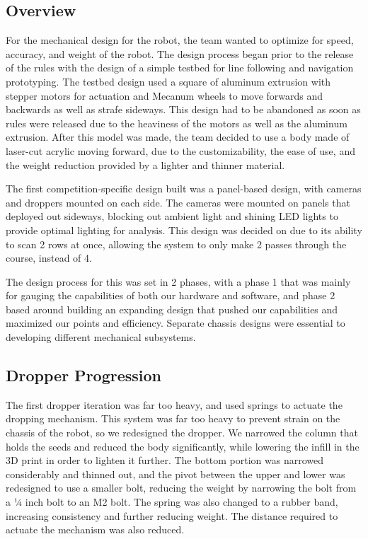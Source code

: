 \documentclass[11pt, twoside]{report}
\begin{document}
\subsection{Overview}
For the mechanical design for the robot, the team wanted to optimize for speed, accuracy, and weight of the robot.  The design process began prior to the release of the rules with the design of a simple testbed for line following and navigation prototyping.  The testbed design used a square of aluminum extrusion with stepper motors for actuation and Mecanum wheels to move forwards and backwards as well as strafe sideways.  This design had to be abandoned as soon as rules were released due to the heaviness of the motors as well as the aluminum extrusion.  After this model was made, the team decided to use a body made of laser-cut acrylic moving forward, due to the customizability, the ease of use, and the weight reduction provided by a lighter and thinner material.

The first competition-specific design built was a panel-based design, with cameras and droppers mounted on each side.  The cameras were mounted on panels that deployed out sideways, blocking out ambient light and shining LED lights to provide optimal lighting for analysis. This design was decided on due to its ability to scan 2 rows at once, allowing the system to only make 2 passes through the course, instead of 4.  

The design process for this was set in 2 phases, with a phase 1 that was mainly for gauging the capabilities of both our hardware and software, and phase 2 based around building an expanding design that pushed our capabilities and maximized our points and efficiency.  Separate chassis designs were essential to developing different mechanical subsystems.

\subsection{Dropper Progression}
The first dropper iteration was far too heavy, and used springs to actuate the dropping mechanism.  This system was far too heavy to prevent strain on the chassis of the robot, so we redesigned the dropper.  We narrowed the column that holds the seeds and reduced the body significantly, while lowering the infill in the 3D print in order to lighten it further.  The bottom portion was narrowed considerably and thinned out, and the pivot between the upper and lower was redesigned to use a smaller bolt, reducing the weight by narrowing the bolt from a ¼ inch bolt to an M2 bolt.  The spring was also changed to a rubber band, increasing consistency and further reducing weight.  The distance required to actuate the mechanism was also reduced.
\end{document}
